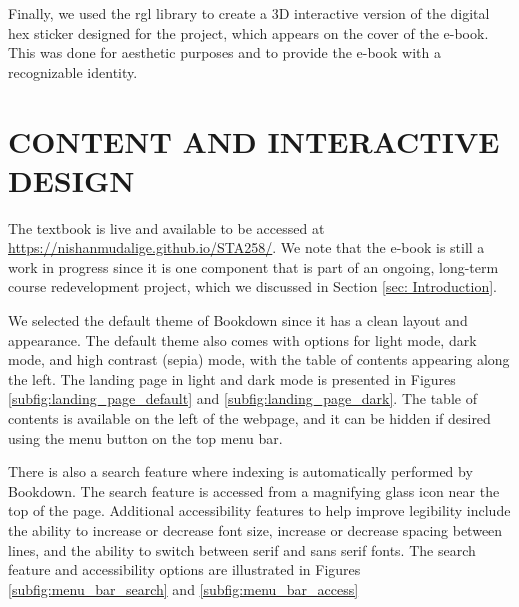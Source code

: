 \documentclass[11pt]{article}
\begin{document}
Finally, we used the rgl library to create a 3D interactive version of the digital hex sticker designed for the project, which appears on the cover of the e-book.
This was done for aesthetic purposes and to provide the e-book with a recognizable identity.


\section{CONTENT AND INTERACTIVE DESIGN}

The textbook is live and available to be accessed at \href{https://nishanmudalige.github.io/STA258/}{https://nishanmudalige.github.io/STA258/}.
We note that the e-book is still a work in progress since it is one component that is part of an ongoing, long-term course redevelopment project, which we discussed in Section \ref{sec: Introduction}.

We selected the default theme of Bookdown since it has a clean layout and appearance.
The default theme also comes with options for light mode, dark mode, and high contrast (sepia) mode, with the table of contents appearing along the left.
The landing page in light and dark mode is presented in Figures \ref{subfig:landing_page_default} and \ref{subfig:landing_page_dark}.
The table of contents is available on the left of the webpage, and it can be hidden if desired using the menu button on the top menu bar.

There is also a search feature where indexing is automatically performed by Bookdown. The search feature is accessed from a magnifying glass icon near the top of the page.
Additional accessibility features to help improve legibility include the ability to increase or decrease font size, increase or decrease spacing between lines, and the ability to switch between serif and sans serif fonts. The search feature and accessibility options are illustrated in Figures \ref{subfig:menu_bar_search} and \ref{subfig:menu_bar_access}
\end{document}
